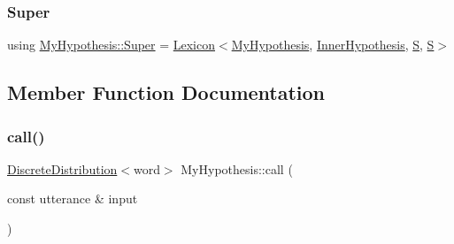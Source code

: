 \mbox{\label{class_my_hypothesis_a266742f266abc638ddc1d1870d735313}} 
\subsubsection{\texorpdfstring{Super}{Super}\hspace{0.1cm}{\footnotesize\ttfamily [5/5]}}
{\footnotesize\ttfamily using \hyperlink{class_my_hypothesis_a266742f266abc638ddc1d1870d735313}{My\+Hypothesis\+::\+Super} =  \hyperlink{class_lexicon}{Lexicon}$<$\hyperlink{class_my_hypothesis}{My\+Hypothesis}, \hyperlink{class_inner_hypothesis}{Inner\+Hypothesis}, \hyperlink{_formal_language_theory-_complex_2_main_8cpp_a51c40915539205f0b5add30b0d68a4cb}{S}, \hyperlink{_formal_language_theory-_complex_2_main_8cpp_a51c40915539205f0b5add30b0d68a4cb}{S}$>$}



\subsection{Member Function Documentation}
\mbox{\label{class_my_hypothesis_a88c6c3c093e040601d7283abf09b6348}} 
\subsubsection{\texorpdfstring{call()}{call()}\hspace{0.1cm}{\footnotesize\ttfamily [1/2]}}
{\footnotesize\ttfamily \hyperlink{class_discrete_distribution}{Discrete\+Distribution}$<$word$>$ My\+Hypothesis\+::call (\begin{DoxyParamCaption}\item[{const utterance \&}]{input }\end{DoxyParamCaption})\hspace{0.3cm}{\ttfamily [inline]}}

\mbox{\label{class_my_hypothesis_a61391d3f1f6fbbe37663b22e2068ac90}} 
